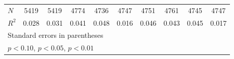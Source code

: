 \begin{table}[htbp]
\begin{tabular}{l*{9}{c}}
\(N\)       &        5419         &        5419         &        4774         &        4736         &        4747         &        4751         &        4761         &        4745         &        4747         \\
\(R^{2}\)   &       0.028         &       0.031         &       0.041         &       0.048         &       0.016         &       0.046         &       0.043         &       0.045         &       0.017         \\
\hline\hline
\multicolumn{10}{l}{\footnotesize Standard errors in parentheses}\\
\multicolumn{10}{l}{\footnotesize \sym{*} \(p<0.10\), \sym{**} \(p<0.05\), \sym{***} \(p<0.01\)}\\
\end{tabular}
\end{table}
